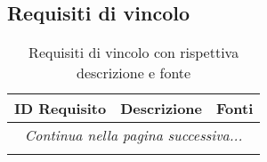 \resetCR
\subsection{Requisiti di vincolo}
\begin{center}
    \begin{longtable}{|p{3cm}|p{9.85cm}|p{2cm}|}
        \hline
        \rowcolor{lighter-grayer}
        \textbf{ID Requisito} & \textbf{Descrizione} & \textbf{Fonti} \\
        \hline
        \endhead
        \hline
        \multicolumn{3}{|c|}{\textit{Continua nella pagina successiva...}} \\
        \hline
        \endfoot
        \endlastfoot




        \rowcolor{white}
        \caption{Requisiti di vincolo con rispettiva descrizione e fonte}
    \end{longtable}
\end{center}


